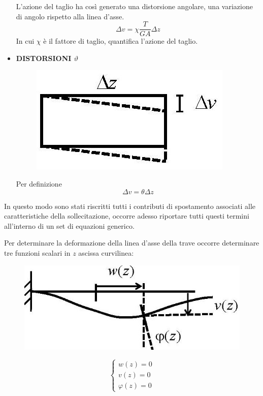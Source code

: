 \documentclass{article}
\begin{document}
\begin{adjustwidth}{2in}{}
\begin{itemize}
			L'azione del taglio ha così generato una distorsione angolare, una variazione di angolo rispetto alla linea d'asse.
			\[ \Delta v = \chi \dfrac{T}{GA} \Delta z \]
			In cui $\chi$ è il fattore di taglio, quantifica l'azione del taglio. \newline
			
			\item \textbf{DISTORSIONI $\vartheta$}
			
\begin{figure}[H]
	\centering
	\includegraphics[width=0.25\linewidth]{"immagini/1.PARTE8_Pagina_10 (2)"}
\end{figure}
			Per definizione 
			\[\Delta v = \theta\Delta z\]
\end{itemize}
\newpage

			In questo modo sono stati riscritti tutti i contributi di spostamento associati alle caratteristiche della sollecitazione, occorre adesso riportare tutti questi termini all'interno di un set di equazioni generico. \newline 
			
			Per determinare la deformazione della linea d’asse della trave occorre determinare tre funzioni scalari in $ z $ ascissa curvilinea:
			
\begin{figure}[H]
	\centering
	\includegraphics[width=0.3\linewidth]{"immagini/1.PARTE8_Pagina_10"}
\end{figure}

			\[ \begin{cases} w(z) = 0 \\ v(z) = 0 \\ \varphi(z) = 0 \end{cases}\]
			

\end{adjustwidth}
\end{document}

